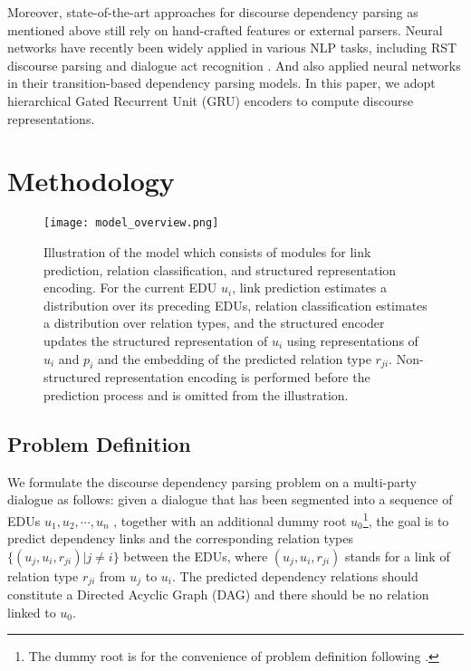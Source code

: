 \documentclass[letterpaper]{article} \usepackage{aaai19}  \usepackage{times}  \usepackage{helvet}  \usepackage{courier}  \usepackage{url}  \usepackage{graphicx}  \usepackage{amssymb}
\begin{document}
Moreover, state-of-the-art approaches for discourse dependency parsing as mentioned above still rely on hand-crafted features or external parsers. 
Neural networks have recently been widely applied in various NLP tasks, including RST discourse parsing \cite{li2016discourse,braud2017cross} and dialogue act recognition \cite{kumar2018dialogue,chen2018dialogue}. 
And \cite{jia2018improved,jia2018modeling} also applied neural networks in their transition-based dependency parsing models. 
In this paper, we adopt hierarchical Gated Recurrent Unit (GRU) \cite{cholearning} encoders to compute discourse representations.

\section{Methodology}

\begin{figure*}[ht]
	\centering
	\texttt{[image: model\_overview.png]}
	\caption{Illustration of the model which consists of modules for link prediction, relation classification, and structured representation encoding. For the current EDU $u_i$, link prediction estimates a distribution over its preceding EDUs, relation classification estimates a distribution over relation types, and the structured encoder updates the structured representation of $u_i$ using representations of $u_i$ and $p_i$ and the embedding of the predicted relation type $r_{ji}$. 
	Non-structured representation encoding is performed before the prediction process and is omitted from the illustration.
	}
	\label{model_overview}
\end{figure*}

\subsection{Problem Definition}
We formulate the discourse dependency parsing problem on a  multi-party dialogue as follows:
given a dialogue that has been segmented into a sequence of EDUs $u_1,u_2,\cdots,u_n$
, together with an additional dummy root $u_0$\footnote{The dummy root is for the convenience of problem definition following \cite{li2014text}.
},
the goal is to predict dependency links and the corresponding relation types $\{ (u_j,u_i,r_{ji})| j\neq i \} $
between the EDUs, where $(u_j,u_i,r_{ji})$ stands for a link of relation type $r_{ji}$ from $u_j$ to $u_i$.
The predicted dependency relations should constitute a Directed Acyclic Graph (DAG) and there should be no relation linked to $u_0$.
\end{document}
